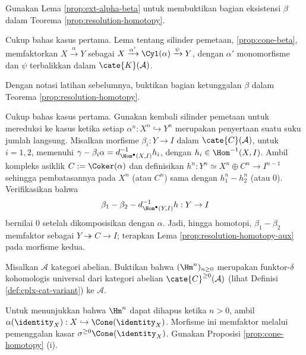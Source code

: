 \begin{Exercises}
	\item Gunakan Lema \ref{prop:ext-alpha-beta} untuk membuktikan bagian
	eksistensi $\beta$ dalam Teorema \ref{prop:resolution-homotopy}.

	\begin{hint}
		Cukup bahas kasus pertama. Lema tentang silinder pemetaan,
		\ref{prop:cone-beta}, memfaktorkan
		$X\xrightarrow{\alpha}Y$ sebagai
		$X\xrightarrow{\alpha'}\Cyl(\alpha)\xrightarrow{\psi}Y$, dengan
		$\alpha'$ monomorfisme dan $\psi$ terbalikkan dalam
		$\cate{K}(\mathcal{A})$.
	\end{hint}

	\item Dengan notasi latihan sebelumnya, buktikan bagian ketunggalan
	$\beta$ dalam Teorema \ref{prop:resolution-homotopy}.

	\begin{hint}
		Cukup bahas kasus pertama. Gunakan kembali silinder pemetaan untuk
		mereduksi ke kasus ketika setiap
		$\alpha^n:X^n\hookrightarrow Y^n$ merupakan penyertaan suatu suku
		jumlah langsung. Misalkan morfisme
		$\beta_i:Y\to I$ dalam $\cate{C}(\mathcal{A})$, untuk $i=1,2$,
		memenuhi
		$\gamma-\beta_i\alpha=d^{-1}_{\Hom^\bullet(X,I)}h_i$, dengan
		$h_i\in\Hom^{-1}(X,I)$. Ambil kompleks asiklik
		$C:=\Coker(\alpha)$ dan definisikan
		$h^n:Y^n\simeq X^n\oplus C^n\to I^{n-1}$ sehingga pembatasannya pada
		$X^n$ (atau $C^n$) sama dengan $h_1^n-h_2^n$ (atau $0$).
		Verifikasikan bahwa
		\[
			\beta_1-\beta_2-d^{-1}_{\Hom^\bullet(Y,I)}h:Y\to I
		\]
		bernilai $0$ setelah dikomposisikan dengan $\alpha$. Jadi, hingga
		homotopi, $\beta_1-\beta_2$ memfaktor sebagai
		$Y\twoheadrightarrow C\to I$; terapkan Lema
		\ref{prop:resolution-homotopy-aux} pada morfisme kedua.
	\end{hint}

	\item Misalkan $\mathcal{A}$ kategori abelian. Buktikan bahwa
	$(\Hm^n)_{n\geq0}$ merupakan funktor-$\delta$ kohomologis universal dari
	kategori abelian $\cate{C}^{\geq0}(\mathcal{A})$ (lihat Definisi
	\ref{def:cplx-cat-variant}) ke $\mathcal{A}$.
	\begin{hint}
		Untuk menunjukkan bahwa $\Hm^n$ dapat dihapus ketika $n>0$, ambil
		$\alpha(\identity_X):X\hookrightarrow\Cone(\identity_X)$. Morfisme ini
		memfaktor melalui pemenggalan kasar
		$\sigma^{\geq0}\Cone(\identity_X)$. Gunakan Proposisi
		\ref{prop:cone-homotopy} (i).
	\end{hint}


\end{Exercises}
